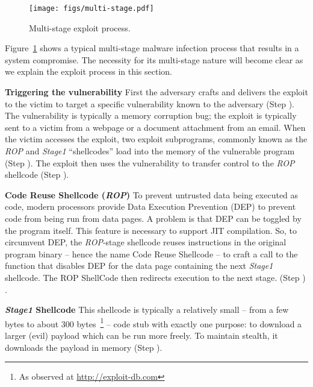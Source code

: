 \documentclass{acm_proc_article-sp}
\begin{document}
\begin{figure}
  \centering
  \texttt{[image: figs/multi-stage.pdf]}
  \caption{Multi-stage exploit process.}
  \label{fig:multi_stage_attack}
\end{figure}

Figure~\ref{fig:multi_stage_attack} shows a typical multi-stage
malware infection process that results in a system compromise. The
necessity for its multi-stage nature will become clear as
we explain the exploit process in this section.

\textbf{Triggering the vulnerability} \space\space First the adversary
crafts and delivers the exploit to the victim to target a specific
vulnerability known to the adversary (Step
\raisebox{.1pt}{\textcircled{\raisebox{-.5pt} {1}}}). The vulnerability
is typically a memory corruption bug; the exploit is typically
sent to a victim from a webpage or a document attachment from an email.
When the victim accesses
the exploit, two exploit subprograms, commonly known as the
\textit{ROP} and \textit{Stage1} ``shellcodes'' load into the memory
of the vulnerable program (Step
\raisebox{.1pt}{\textcircled{\raisebox{-.5pt} {2}}}). The exploit
then uses the vulnerability to transfer control to the \textit{ROP}
shellcode (Step \raisebox{.1pt}{\textcircled{\raisebox{-.5pt} {3}}}).

\textbf{Code Reuse Shellcode (\textit{ROP})} \space\space To
prevent untrusted data being executed
as code, modern processors provide Data Execution Prevention (DEP)
to prevent code from being run from data pages.  A problem is that
DEP can be toggled by the program itself. This feature is necessary
to support JIT compilation.  So, to circumvent DEP, the \textit{ROP}-stage
shellcode reuses instructions in the original program
binary -- hence the name Code Reuse Shellcode -- to craft a call
to the function that disables DEP for the data page containing the
next \textit{Stage1} shellcode. The ROP ShellCode then redirects
execution to the next stage.  (Step
\raisebox{.1pt}{\textcircled{\raisebox{-.5pt} {4}}}) \cite{Corelan:2011,
pappastransparent}.

\textbf{\textit{Stage1} Shellcode} \space\space This shellcode is
typically a relatively small -- from a few bytes to about 300
bytes~\footnote{As observed at \url{http://exploit-db.com}} -- code
stub with exactly one purpose: to download a larger (evil) payload
which can be run more freely. To maintain stealth, it downloads the
payload in memory (Step \raisebox{.1pt}{\textcircled{\raisebox{-.5pt}
{5}}}). 
\end{document}
